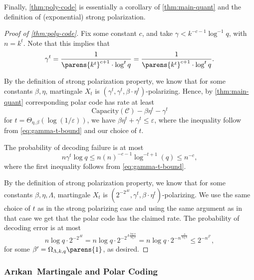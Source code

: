 \documentclass[11pt]{article}
\newcommand{\Arikan}{Ar\i kan}
\newcommand{\cC}{\mathcal{C}}
\newcommand{\two}{}
\begin{document}
Finally, \cref{thm:poly-code} is essentially a corollary of \cref{thm:main-quant} and the definition of (exponential) strong polarization.
\begin{proof}[Proof of \cref{thm:poly-code}]
	Fix some constant $c$, and take $\gamma < k^{-c - 1} \log^{-1} q$, with $n=k^t$. Note that this implies that
	\begin{equation}
	\label{eq:gamma-t-bound}
	    \gamma^t = \frac{1}{\parens{k^t}^{c+1}\cdot \log^t{q}}= \frac{1}{\parens{k^t}^{c+1}\cdot \log^t{q}}.
	\end{equation}

	
	By the definition of strong polarization property, we know that for some constants $\beta, \eta$, martingale $X_t$ is $(\gamma^{t}, \gamma^t, \beta \cdot \eta^t)$-polarizing. Hence, by \cref{thm:main-quant} corresponding polar code has rate at least
	\begin{equation*}
		\text{Capacity}(\cC) - \beta \eta^t - \two\gamma^t 
	\end{equation*}
	for $t = \Theta_{\eta, \beta}(\log(1/\varepsilon))$, we have $\beta \eta^t + \gamma^t \leq \varepsilon$, where the inequality follow from \cref{eq:gamma-t-bound} and our choice of $t$.
	
	The probability of decoding failure is at most
	\begin{equation*}
		n \gamma^t \log q \leq n (n)^{-c-1} \log^{-t + 1}(q) \leq n^{-c},
	\end{equation*}
	where the first inequality follows from \cref{eq:gamma-t-bound}.
	
		By the definition of strong polarization property, we know that for some constants $\beta, \eta,\Lambda$, martingale $X_t$ is $(2^{-2^{\Lambda t}}, \gamma^t, \beta \cdot \eta^t)$-polarizing. We use the same choice of $t$ as in the strong polarizing case and using the same argument as in that case we get that the polar code has the claimed rate. The probability of decoding error is at most
		\[n\log{q}\cdot 2^{-2^{\Lambda t}} = n\log{q}\cdot 2^{-2^{\Lambda \frac{\log{n}}{\log{k}}}} = n\log{q}\cdot 2^{- n^\frac{\Lambda}{\log{k}}} \le 2^{-n^{\beta'}},\]
		for some $\beta'=\Omega_{\Lambda,k,q}\parens{1}$, as desired.
	
\end{proof}

\subsubsection{\Arikan~Martingale and Polar Coding}
\label{sec:correspondence}
\end{document}
